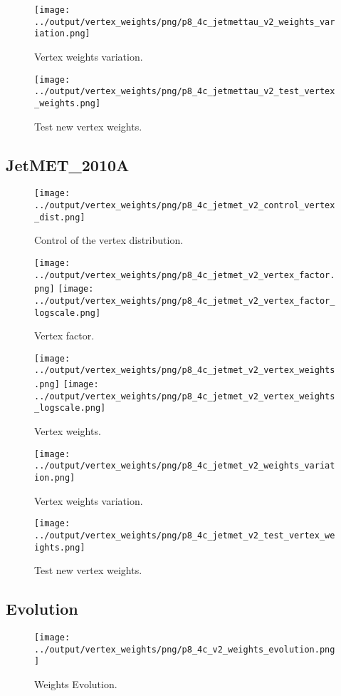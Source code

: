 \documentclass[11pt]{book}
\begin{document}
\begin{figure}[ht]
\centering
\texttt{[image: ../output/vertex\_weights/png/p8\_4c\_jetmettau\_v2\_weights\_variation.png]}
\caption{Vertex weights variation.}
\end{figure}

\begin{figure}[ht]
\centering
\texttt{[image: ../output/vertex\_weights/png/p8\_4c\_jetmettau\_v2\_test\_vertex\_weights.png]}
\caption{Test new vertex weights.}
\end{figure}
\clearpage

\subsection{JetMET\_2010A}
\begin{figure}[ht]
\centering
\texttt{[image: ../output/vertex\_weights/png/p8\_4c\_jetmet\_v2\_control\_vertex\_dist.png]}
\caption{Control of the vertex distribution.}
\end{figure}

\begin{figure}[ht]
\centering
\texttt{[image: ../output/vertex\_weights/png/p8\_4c\_jetmet\_v2\_vertex\_factor.png]}
\texttt{[image: ../output/vertex\_weights/png/p8\_4c\_jetmet\_v2\_vertex\_factor\_logscale.png]}
\caption{Vertex factor.}
\end{figure}

\begin{figure}[ht]
\centering
\texttt{[image: ../output/vertex\_weights/png/p8\_4c\_jetmet\_v2\_vertex\_weights.png]}
\texttt{[image: ../output/vertex\_weights/png/p8\_4c\_jetmet\_v2\_vertex\_weights\_logscale.png]}
\caption{Vertex weights.}
\end{figure}

\begin{figure}[ht]
\centering
\texttt{[image: ../output/vertex\_weights/png/p8\_4c\_jetmet\_v2\_weights\_variation.png]}
\caption{Vertex weights variation.}
\end{figure}

\begin{figure}[ht]
\centering
\texttt{[image: ../output/vertex\_weights/png/p8\_4c\_jetmet\_v2\_test\_vertex\_weights.png]}
\caption{Test new vertex weights.}
\end{figure}
\clearpage

\subsection{Evolution}
\begin{figure}[ht]
\centering
\texttt{[image: ../output/vertex\_weights/png/p8\_4c\_v2\_weights\_evolution.png]}
\caption{Weights Evolution.}
\end{figure}
\end{document}
